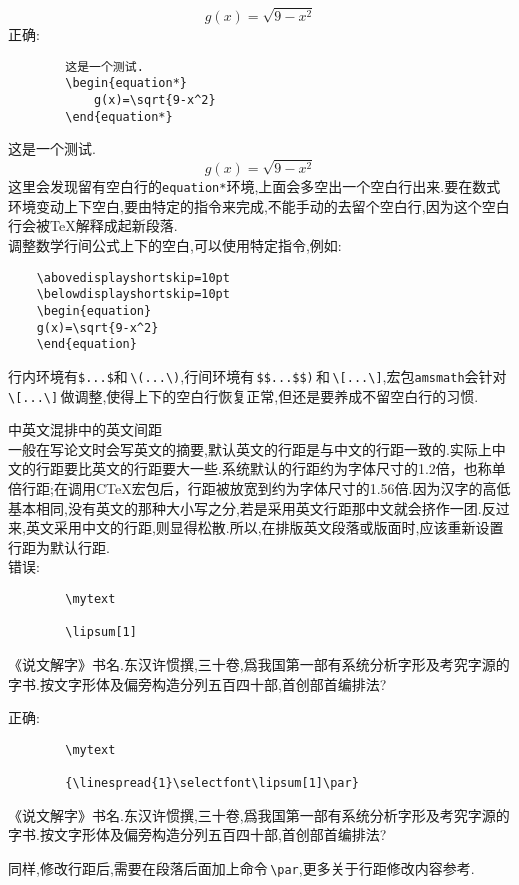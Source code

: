 \documentclass[a4paper]{article}
\newcommand{\stcite}[2]{\CJKecglue\cite[#1]{#2}}
\newcommand{\mytext}{《说文解字》书名.东汉许惯撰,三十卷,爲我国第一部有系统分析字形及考究字源的字书.按文字形体及偏旁构造分列五百四十部,首创部首编排法?\eop}
\begin{document}
\begin{compactitem}[\hspace{1.02em}$\bullet$]
	\begin{equation*}
		g(x)=\sqrt{9-x^2}
	\end{equation*}
	\textsf{正确}:\eop
	\begin{verbatim}
		这是一个测试.
		\begin{equation*}
			g(x)=\sqrt{9-x^2}
		\end{equation*}
	\end{verbatim}
	这是一个测试.\eop
	\begin{equation*}
		g(x)=\sqrt{9-x^2}
	\end{equation*}
	这里会发现留有空白行的\texttt{equation*}环境,上面会多空出一个空白行出来.要在数式环境变动上下空白,要由特定的指令来完成,不能手动的去留个空白行,因为这个空白行会被\TeX{}解释成起新段落.\\
	调整数学行间公式上下的空白,可以使用特定指令,例如:\eop
	\begin{verbatim}
	\abovedisplayshortskip=10pt
	\belowdisplayshortskip=10pt
	\begin{equation}
	g(x)=\sqrt{9-x^2}
	\end{equation}
	\end{verbatim}
	行内环境有\texttt{\$...\$}和\,\verb|\(...\)|,行间环境有\,\verb|$$...$$)|\,和\,\verb|\[...\]|,宏包\texttt{amsmath}会针对\,\verb|\[...\]|\,做调整,使得上下的空白行恢复正常,但还是要养成不留空白行的习惯.
	\item 中英文混排中的英文间距\\
	一般在写论文时会写英文的摘要,默认英文的行距是与中文的行距一致的.实际上中文的行距要比英文的行距要大一些.系统默认的行距约为字体尺寸的1.2倍，也称单倍行距;在调用C\TeX{}宏包后，行距被放宽到约为字体尺寸的1.56倍.因为汉字的高低基本相同,没有英文的那种大小写之分,若是采用英文行距那中文就会挤作一团.反过来,英文采用中文的行距,则显得松散.所以,在排版英文段落或版面时,应该重新设置行距为默认行距.\\
	\textsf{错误}:\eop
	\begin{verbatim}
		\mytext

		\lipsum[1]
	\end{verbatim}
	\mytext

	\lipsum[1]

	\textsf{正确}:\eop
	\begin{verbatim}
		\mytext

		{\linespread{1}\selectfont\lipsum[1]\par}
	\end{verbatim}
	\mytext

	{\linespread{1}\selectfont\lipsum[1]\par}

	同样,修改行距后,需要在段落后面加上命令\,\verb|\par|,更多关于行距修改内容参考\stcite{\textbf{4.2.10 行距}}{6}.\eop
\end{compactitem}
\end{document}
